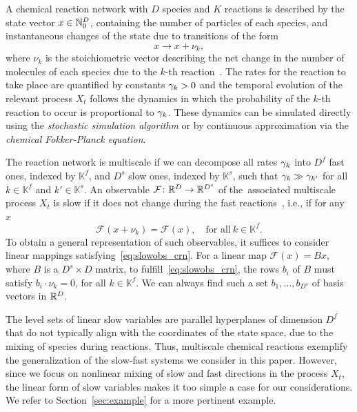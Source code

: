 \documentclass{article}
\newcommand{\obs}{\mathcal{F}} %
\newcommand{\K}{\mathbb{K}} %
\begin{document}
\begin{exa}
A chemical reaction network with $D$ species and $K$ reactions is described by the state vector $x\in\mathbb{N}_0^D$, containing the number of particles of each species, and instantaneous changes of the state due to transitions of the form
\begin{equation*}
    x\to x+\nu_k,
\end{equation*}
where $\nu_k$ is the stoichiometric vector describing the net change in the number of molecules of each species due to the $k$-th reaction~\cite{erban_stochastic_2019,winkelmann_stochastic_2020}. The rates for the reaction to take place are quantified by constants $\gamma_k>0$ and the temporal evolution of the relevant process $X_t$ follows the dynamics in which the probability of the $k$-th reaction to occur is proportional to $\gamma_k$. These dynamics can be simulated directly using the \emph{stochastic simulation algorithm} or by continuous approximation via the \emph{chemical Fokker-Planck equation}. 

The reaction network is multiscale if we can decompose all rates $\gamma_k$ into $D^f$ fast ones, indexed by $\K^f$, and $D^s$ slow ones, indexed by $\K^s$, such that $\gamma_k\gg\gamma_{k'}$ for all $k\in\K^f$ and $k'\in\K^s$. An observable $\obs\from\R^D\to\R^{D^s}$ of the~associated multiscale process $X_t$ is slow if it does not change during the fast reactions~\cite{e_nested_2007}, i.e., if for any~$x$
\begin{equation}\label{eq:slowobs_crn}
    \obs(x+\nu_k) = \obs(x),\quad\text{for all}\ k\in\K^f.
\end{equation}
To obtain a general representation of such observables, it suffices to consider linear mappings satisfying~\eqref{eq:slowobs_crn}. For a linear map $\obs(x)=Bx$, where $B$ is a $D^s\times D$ matrix, to fulfill~\eqref{eq:slowobs_crn}, the rows $b_i$ of $B$ must satisfy $b_i\cdot\nu_k=0$, for all $k\in\K^f$. We can always find such a set $b_1,\dotsc,b_{D^s}$ of basis vectors in $\mathbb{R}^D$.

The level sets of linear slow variables are parallel hyperplanes of dimension $D^f$ that do not typically align with the coordinates of the state space, due to the mixing of species during reactions. Thus, multiscale chemical reactions exemplify the generalization of the slow-fast systems we consider in this paper. However, since we focus on nonlinear mixing of slow and fast directions in the process $X_t$, the linear form of slow variables makes it too simple a case for our considerations. We refer to Section~\ref{sec:example} for a more pertinent example.
\end{exa}
\end{document}
